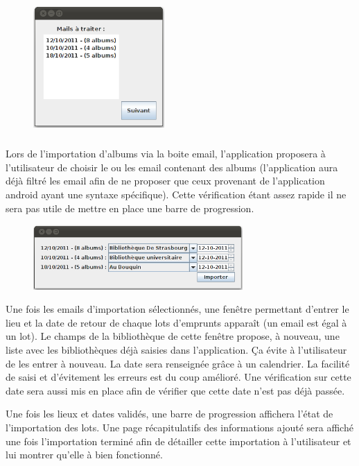 \documentclass[etudiants]{support-iutrs}
\begin{document}
\begin{figure}
\includegraphics[width=5cm]{img/import_mail.png}
\end{figure}\subparagraph{}

Lors de l'importation d'albums via la boite email, l'application proposera à l'utilisateur de choisir le ou les email contenant des albums (l'application aura déjà filtré les email afin de ne proposer que ceux provenant de l'application android ayant une syntaxe spécifique). 
Cette vérification étant assez rapide il ne sera pas utile de mettre en place une barre de progression.

\begin{figure}
\includegraphics[width=8cm]{img/ajout_import.png}
\end{figure}
Une fois les emails d'importation sélectionnés, une fenêtre permettant d'entrer le lieu et la date de retour de chaque lots d'emprunts apparaît (un email est égal à un lot).
Le champs de la bibliothèque de cette fenêtre propose, à nouveau, une liste avec les bibliothèques déjà saisies dans l’application.
Ça évite à l’utilisateur de les entrer à nouveau.
La date sera renseignée grâce à un calendrier. La facilité de saisi et d'évitement les erreurs est du coup amélioré. 
Une vérification sur cette date sera aussi mis en place afin de vérifier que cette date n'est pas déjà passée.

Une fois les lieux et dates validés,
une barre de progression affichera l’état de l'importation des lots. 
Une page récapitulatifs des informations ajouté sera affiché une fois l'importation terminé afin de détailler cette importation à l'utilisateur et lui montrer qu'elle à bien fonctionné.
 
\end{document}
